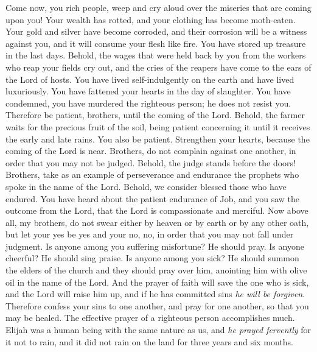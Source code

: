 \begin{biblechapter} %
 Come now, you rich people, weep and cry aloud over the miseries that are coming upon you!
\verse Your wealth has rotted, and your clothing has become moth-eaten.
\verse Your gold and silver have become corroded, and their corrosion will be a witness against you, and it will consume your flesh like fire. You have stored up treasure in the last days.
\verse Behold, the wages that were held back by you from the workers who reap your fields cry out, and the cries of the reapers have come to the ears of the Lord of hosts.
\verse You have lived self-indulgently on the earth and have lived luxuriously. You have fattened your hearts in the day of slaughter.
\verse You have condemned, you have murdered the righteous person; he does not resist you.
 Therefore be patient, brothers, until the coming of the Lord. Behold, the farmer waits for the precious fruit of the soil, being patient concerning it until it receives the early and late rains.
\verse You also be patient. Strengthen your hearts, because the coming of the Lord is near.
\verse Brothers, do not complain against one another, in order that you may not be judged. Behold, the judge stands before the doors!
\verse Brothers, take as an example of perseverance and endurance the prophets who spoke in the name of the Lord.
\verse Behold, we consider blessed those who have endured. You have heard about the patient endurance of Job, and you saw the outcome from the Lord, that the Lord is compassionate and merciful.
\verse Now above all, my brothers, do not swear either by heaven or by earth or by any other oath, but let your yes be yes and your no, no, in order that you may not fall under judgment.
 Is anyone among you suffering misfortune? He should pray. Is anyone cheerful? He should sing praise.
\verse Is anyone among you sick? He should summon the elders of the church and they should pray over him, anointing him with olive oil in the name of the Lord.
\verse And the prayer of faith will save the one who is sick, and the Lord will raise him up, and if he has committed sins \textit{he will be forgiven}.
\verse Therefore confess your sins to one another, and pray for one another, so that you may be healed. The effective prayer of a righteous person accomplishes much.
\verse Elijah was a human being with the same nature as us, and \textit{he prayed fervently} for it not to rain, and it did not rain on the land for three years and six months.

\end{biblechapter}
